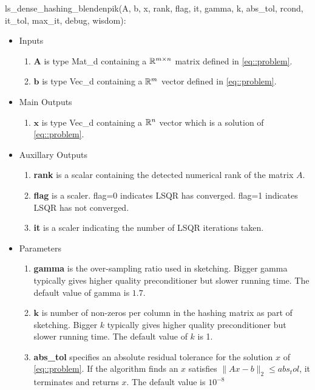 \documentclass[english,11pt]{article}
\begin{document}
ls_dense_hashing_blendenpik(A, b, x, rank, flag, it, gamma, k, abs_tol, rcond, it_tol, max_it, debug, wisdom):
	\begin{itemize}
	\setlength\itemsep{-0.5em}
	\item Inputs 
		\begin{enumerate}
			\item $\mathbf A$ is type Mat_d containing a $\mathbb{R}^{m\times n}$ matrix defined in \eqref{eq::problem}.
			\item $\mathbf b$ is type Vec_d containing a $\mathbb{R}^m$ vector defined in \eqref{eq::problem}.
		\end{enumerate}
	
	\item Main Outputs
		\begin{enumerate}
			\item { $\mathbf x$} is type Vec_d containing a $\mathbb{R}^n$ vector which is a solution of \eqref{eq::problem}.
		\end{enumerate}

	\item Auxillary Outputs
		\begin{enumerate}
			\item {\bf rank} is a scalar containing the detected numerical rank of the matrix $A$. 
			\item {\bf flag} is a scaler. flag=0 indicates LSQR has converged. flag=1 indicates LSQR has not converged. 
			\item {\bf it} is a scaler indicating the number of LSQR iterations taken. 
		\end{enumerate}
		

	\item Parameters
		\begin{enumerate}
			\item {\bf gamma} is the over-sampling ratio used in sketching. Bigger gamma typically gives higher quality preconditioner but slower running time. The default value of gamma is $1.7$.

			\item $\mathbf k$ is number of non-zeros per column in the hashing matrix as part of sketching. Bigger $k$ typically gives higher quality preconditioner but slower running time. The default value of $k$ is 1. 

			\item {\bf abs_tol} specifies an absolute residual tolerance for the solution $x$ of \ref{eq::problem}. If the algorithm finds an $x$ satisfies $\|Ax-b\|_2 \leq abs_tol$, it terminates and returns $x$. The default value is $10^{-8}$


\end{enumerate}
\end{itemize}
\end{document}
